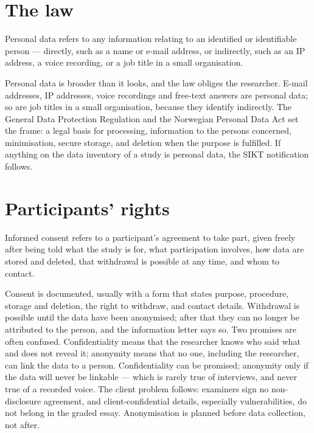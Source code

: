 \documentclass[11pt,a4paper,british,twoside=false,headings=small,chapterprefix=false,numbers=noenddot]{scrbook}
\newenvironment{block}[1]{\begin{tcolorbox}[scriptbox, title={#1}]}{\end{tcolorbox}}
\begin{document}
\section{The law}

\begin{block}{Personal data}
Personal data refers to any information relating to an identified or identifiable person --- directly, such as a name or e-mail address, or indirectly, such as an IP address, a voice recording, or a job title in a small organisation.
\end{block}

Personal data is broader than it looks, and the law obliges the researcher. E-mail addresses, IP addresses, voice recordings and free-text answers are personal data; so are job titles in a small organisation, because they identify indirectly. The General Data Protection Regulation and the Norwegian Personal Data Act set the frame: a legal basis for processing, information to the persons concerned, minimisation, secure storage, and deletion when the purpose is fulfilled. If anything on the data inventory of a study is personal data, the SIKT notification follows.

\section{Participants' rights}

\begin{block}{Informed consent}
Informed consent refers to a participant's agreement to take part, given freely after being told what the study is for, what participation involves, how data are stored and deleted, that withdrawal is possible at any time, and whom to contact.
\end{block}

Consent is documented, usually with a form that states purpose, procedure, storage and deletion, the right to withdraw, and contact details. Withdrawal is possible until the data have been anonymised; after that they can no longer be attributed to the person, and the information letter says so. Two promises are often confused. Confidentiality means that the researcher knows who said what and does not reveal it; anonymity means that no one, including the researcher, can link the data to a person. Confidentiality can be promised; anonymity only if the data will never be linkable --- which is rarely true of interviews, and never true of a recorded voice. The client problem follows: examiners sign no non-disclosure agreement, and client-confidential details, especially vulnerabilities, do not belong in the graded essay. Anonymisation is planned before data collection, not after.
\end{document}
